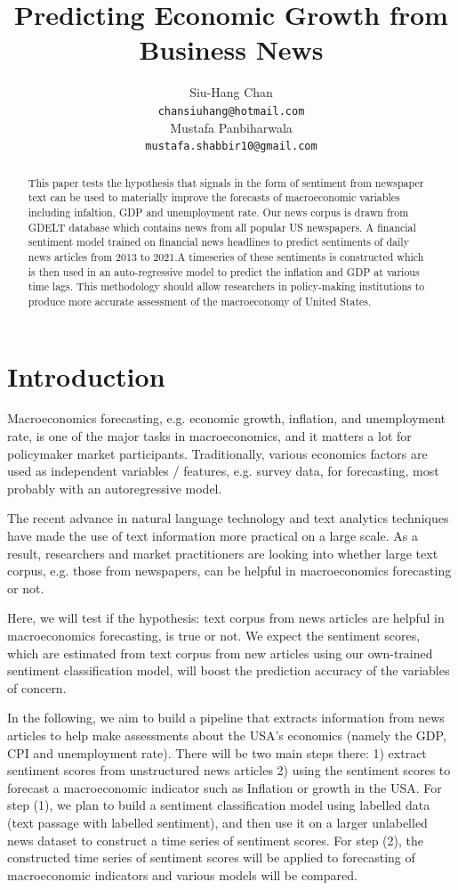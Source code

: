 \documentclass[11pt,a4paper]{article}
\title{Predicting Economic Growth from Business News}
\author{Siu-Hang Chan \\
  \texttt{chansiuhang@hotmail.com} \\\And
  Mustafa Panbiharwala \\
  \texttt{mustafa.shabbir10@gmail.com} \\}
\date{}
\begin{document}
\maketitle
\begin{abstract}
This paper tests the hypothesis that signals in the form of sentiment from newspaper text can be used to materially improve the forecasts of macroeconomic variables including infaltion, GDP and unemployment rate. Our news corpus is drawn from GDELT database which contains news from all popular US newspapers. A financial sentiment model trained on financial news headlines to predict sentiments of daily news articles from 2013 to 2021.A timeseries of these sentiments is constructed which is then used in an auto-regressive model to predict the inflation and GDP at various time lags. This methodology should allow researchers in policy-making institutions to produce more accurate assessment of the macroeconomy of United States. 
\end{abstract}

\section{Introduction}

Macroeconomics forecasting, e.g. economic growth, inflation, and unemployment rate, is one of the major tasks in macroeconomics, and it matters a lot for policymaker market participants. Traditionally, various economics factors are used as independent variables / features, e.g. survey data, for forecasting, most probably with an autoregressive model.

The recent advance in natural language technology and text analytics techniques have made the use of text information more practical on a large scale. As a result, researchers and market practitioners are looking into whether large text corpus, e.g. those from newspapers, can be helpful in macroeconomics forecasting or not.

Here, we will test if the hypothesis: text corpus from news articles are helpful in macroeconomics forecasting, is true or not. We expect the sentiment scores, which are estimated from text corpus from new articles using our own-trained sentiment classification model, will boost the prediction accuracy of the variables of concern.

In the following, we aim to build a pipeline that extracts information from news articles to help make assessments about the USA's economics (namely the GDP, CPI and unemployment rate). There will be two main steps there: 1) extract sentiment scores from unstructured news articles 2) using the sentiment scores to forecast a macroeconomic indicator such as Inflation or growth in the USA. For step (1), we plan to build a sentiment classification model using labelled data (text passage with labelled sentiment), and then use it on a larger unlabelled news dataset to construct a time series of sentiment scores. For step (2), the constructed time series of sentiment scores will be applied to forecasting of macroeconomic indicators and various models will be compared.
\end{document}
